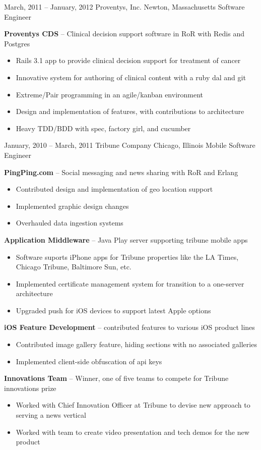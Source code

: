 \documentclass[]{friggeri-cv}
\begin{document}
\begin{entrylist}
    \entryalt
    {March, 2011 -- January, 2012}
    {Proventys, Inc.}
    {Newton, Massachusetts}
    {Software Engineer}
    {\textbf{Proventys CDS} -- Clinical decision support software in RoR with Redis and Postgres
    \begin{itemize}
      \item Rails 3.1 app to provide clinical decision support for treatment of cancer
      \item Innovative system for authoring of clinical content with a ruby dal and git
      \item Extreme/Pair programming in an agile/kanban environment
      \item Design and implementation of features, with contributions to architecture
      \item Heavy TDD/BDD with spec, factory girl, and cucumber     
    \end{itemize}}
    
    \entryalt
    {January, 2010 -- March, 2011}
    {Tribune Company}
    {Chicago, Illinois}
    {Mobile Software Engineer}
    {\textbf{PingPing.com} -- Social messaging and news sharing with RoR and Erlang
    \begin{itemize}
      \item Contributed design and implementation of geo location support
      \item Implemented graphic design changes
      \item Overhauled data ingestion systems
    \end{itemize}
    \textbf{Application Middleware} -- Java Play server supporting tribune mobile apps
    \begin{itemize}
      \item Software suports iPhone apps for Tribune properties like the LA Times, Chicago Tribune, Baltimore Sun, etc.
      \item Implemented certificate management system for transition to a one-server architecture
      \item Upgraded push for iOS devices to support latest Apple options
    \end{itemize}
    \textbf{iOS Feature Development} -- contributed features to various iOS product lines
    \begin{itemize}
      \item Contributed image gallery feature, hiding sections with no associated galleries
      \item Implemented client-side obfuscation of api keys
    \end{itemize}
    \textbf{Innovations Team} -- Winner, one of five teams to compete for Tribune innovations prize
    \begin{itemize}
      \item Worked with Chief Innovation Officer at Tribune to devise new approach to serving a news vertical
      \item Worked with team to create video presentation and tech demos for the new product
    \end{itemize}}


\end{entrylist}
\end{document}
